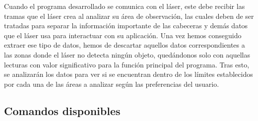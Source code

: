 Cuando el programa desarrollado se comunica con el láser, este debe recibir las tramas que el láser crea al analizar su área de observación, las cuales deben de ser tratadas para separar la información importante de las cabeceras y demás datos que el láser usa para interactuar con su aplicación. Una vez hemos conseguido extraer ese tipo de datos, hemos de descartar aquellos datos correspondientes a las zonas donde el láser no detecta ningún objeto, quedándonos solo con aquellas lecturas con valor significativo para la función principal del programa. Tras esto, se analizarán los datos para ver si se encuentran dentro de los límites establecidos por cada una de las áreas a analizar según las preferencias del usuario.\\

\subsection{Comandos disponibles}

